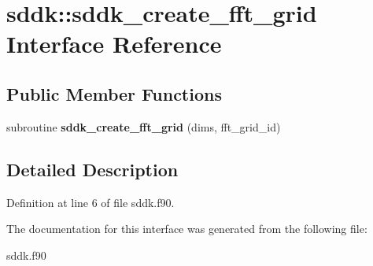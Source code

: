 \hypertarget{interfacesddk_1_1sddk__create__fft__grid}{}\section{sddk\+:\+:sddk\+\_\+create\+\_\+fft\+\_\+grid Interface Reference}
\label{interfacesddk_1_1sddk__create__fft__grid}
\subsection*{Public Member Functions}
\begin{DoxyCompactItemize}
\item 
\hypertarget{interfacesddk_1_1sddk__create__fft__grid_a90085fb6c817b4e30373f2fc9cec2188}{}subroutine {\bfseries sddk\+\_\+create\+\_\+fft\+\_\+grid} (dims, fft\+\_\+grid\+\_\+id)\label{interfacesddk_1_1sddk__create__fft__grid_a90085fb6c817b4e30373f2fc9cec2188}

\end{DoxyCompactItemize}


\subsection{Detailed Description}


Definition at line 6 of file sddk.\+f90.



The documentation for this interface was generated from the following file\+:\begin{DoxyCompactItemize}
\item 
sddk.\+f90\end{DoxyCompactItemize}
